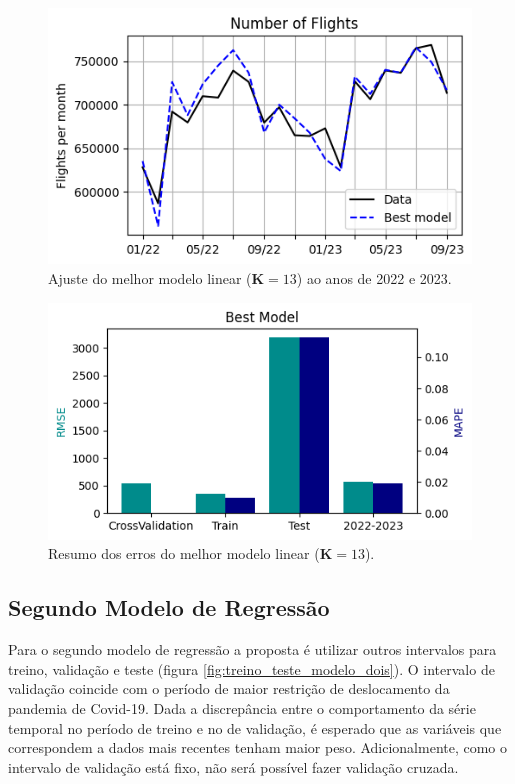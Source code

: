 \documentclass[final,5p]{elsarticle}
\numberwithin{equation}{section}
\begin{document}
        \begin{figure}[hbt!]
            \includegraphics[width=0.95\columnwidth]{B3_BestModel22_23.png}
            \caption{Ajuste do melhor modelo linear ($\textbf{K} = 13$) ao anos de 2022 e 2023.}
            \label{fig:melhor_modelo_2223}
        \end{figure}

        \begin{figure}[hbt!]
            \includegraphics[width=0.95\columnwidth]{B3_RMSE.png}
            \caption{Resumo dos erros do melhor modelo linear ($\textbf{K} = 13$).}
            \label{fig:erros_melhor_modelo}
        \end{figure}

        \subsection{Segundo Modelo de Regressão}

        Para o segundo modelo de regressão a proposta é utilizar outros intervalos para treino, validação e teste (figura \ref{fig:treino_teste_modelo_dois}). O intervalo de validação coincide com o período de maior restrição de deslocamento da pandemia de Covid-19. Dada a discrepância entre o comportamento da série temporal no período de treino e no de validação, é esperado que as variáveis que correspondem a dados mais recentes tenham maior peso. Adicionalmente, como o intervalo de validação está fixo, não será possível fazer validação cruzada.
\end{document}
